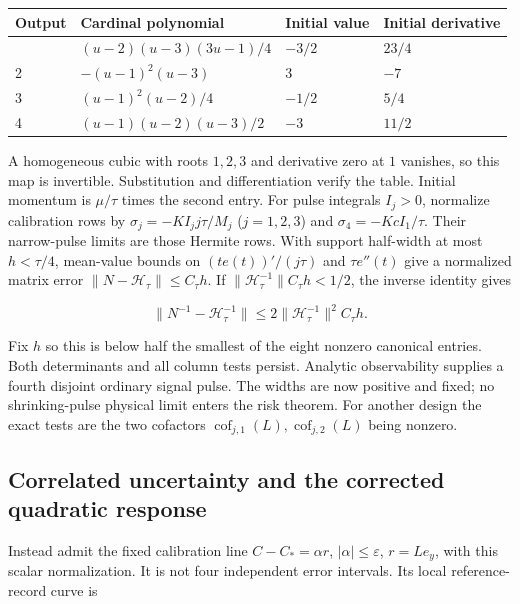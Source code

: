\documentclass[11pt,a4paper]{article}
\begin{document}
\begin{longtable}[]{@{}llll@{}}
\toprule\noalign{}
Output & Cardinal polynomial & Initial value & Initial derivative \\
\midrule\noalign{}
\endhead
\bottomrule\noalign{}
\endlastfoot
1 & \((u-2)(u-3)(3u-1)/4\) & \(-3/2\) & \(23/4\) \\
2 & \(-(u-1)^2(u-3)\) & \(3\) & \(-7\) \\
3 & \((u-1)^2(u-2)/4\) & \(-1/2\) & \(5/4\) \\
4 & \((u-1)(u-2)(u-3)/2\) & \(-3\) & \(11/2\) \\
\end{longtable}

A homogeneous cubic with roots \(1,2,3\) and derivative zero at \(1\)
vanishes, so this map is invertible. Substitution and differentiation
verify the table. Initial momentum is \(\mu/\tau\) times the second
entry. For pulse integrals \(I_j>0\), normalize calibration rows by
\(\sigma_j=-KI_jj\tau/M_j\) (\(j=1,2,3\)) and \(\sigma_4=-KcI_1/\tau\).
Their narrow-pulse limits are those Hermite rows. With support
half-width at most \(h<\tau/4\), mean-value bounds on
\((te(t))'/(j\tau)\) and \(\tau e''(t)\) give a normalized matrix error
\(\|N-\mathcal H_\tau\|\le C_\tau h\). If
\(\|\mathcal H_\tau^{-1}\|C_\tau h<1/2\), the inverse identity gives

\[\|N^{-1}-\mathcal H_\tau^{-1}\|
 \le2\|\mathcal H_\tau^{-1}\|^2C_\tau h.\]

Fix \(h\) so this is below half the smallest of the eight nonzero
canonical entries. Both determinants and all column tests persist.
Analytic observability supplies a fourth disjoint ordinary signal pulse.
The widths are now positive and fixed; no shrinking-pulse physical limit
enters the risk theorem. For another design the exact tests are the two
cofactors \(\operatorname{cof}_{j,1}(L),\operatorname{cof}_{j,2}(L)\)
being nonzero.

\hypertarget{correlated-uncertainty-and-the-corrected-quadratic-response}{%
\subsection{Correlated uncertainty and the corrected quadratic
response}\label{correlated-uncertainty-and-the-corrected-quadratic-response}}

Instead admit the fixed calibration line \(C-C_*=\alpha r\),
\(|\alpha|\le\varepsilon\), \(r=Le_y\), with this scalar normalization.
It is not four independent error intervals. Its local reference-record
curve is
\end{document}
